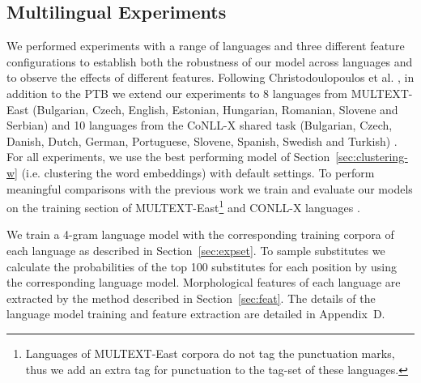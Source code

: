 \subsection{Multilingual Experiments}
\label{sec:multilang}
\noindent We performed experiments with a range of languages and three
different feature configurations to establish both the robustness of
our model across languages and to observe the effects of different
features.  Following Christodoulopoulos et
al. , in
addition to the PTB we extend our experiments to 8 languages from
MULTEXT-East (Bulgarian, Czech, English, Estonian, Hungarian,
Romanian, Slovene and Serbian) \cite{citeulike:5820223} and 10
languages from the CoNLL-X shared task (Bulgarian, Czech, Danish,
Dutch, German, Portuguese, Slovene, Spanish, Swedish and Turkish)
\cite{Buchholz:2006:CST:1596276.1596305}.  For all experiments, we use
the best performing model of Section~\ref{sec:clustering-w} (i.e.
clustering the word embeddings) with default settings.  To perform
meaningful comparisons with the previous work we train and evaluate
our models on the training section of MULTEXT-East\footnote{Languages
  of MULTEXT-East corpora do not tag the punctuation marks, thus we
  add an extra tag for punctuation to the tag-set of these languages.}
and CONLL-X languages \cite{Lee:2010:STU:1870658.1870741}.



We train a 4-gram language model with the corresponding training
corpora of each language as described in Section~\ref{sec:expset}.  To
sample substitutes we calculate the probabilities of the top 100
substitutes for each position by using the corresponding language
model.  Morphological features of each language are extracted by the
method described in Section~\ref{sec:feat}.  The details of the
language model training and feature extraction are detailed in
Appendix~D.

